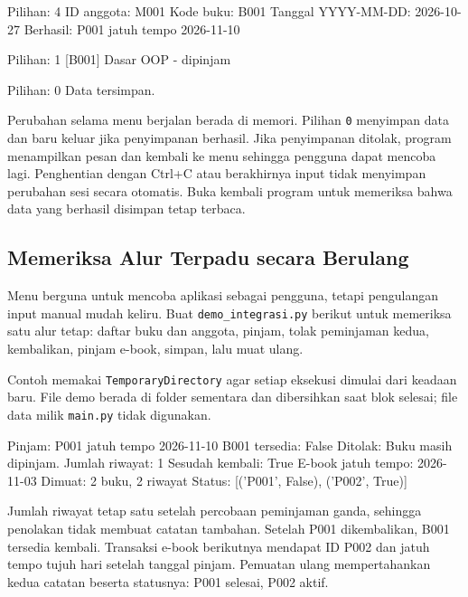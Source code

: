 \begin{keluaran}
Pilihan: 4
ID anggota: M001
Kode buku: B001
Tanggal YYYY-MM-DD: 2026-10-27
Berhasil: P001 jatuh tempo 2026-11-10

Pilihan: 1
[B001] Dasar OOP - dipinjam

Pilihan: 0
Data tersimpan.
\end{keluaran}

Perubahan selama menu berjalan berada di memori. Pilihan \texttt{0} menyimpan data dan baru keluar jika penyimpanan berhasil. Jika penyimpanan ditolak, program menampilkan pesan dan kembali ke menu sehingga pengguna dapat mencoba lagi. Penghentian dengan Ctrl+C atau berakhirnya input tidak menyimpan perubahan sesi secara otomatis. Buka kembali program untuk memeriksa bahwa data yang berhasil disimpan tetap terbaca.

\subsection{Memeriksa Alur Terpadu secara Berulang}

Menu berguna untuk mencoba aplikasi sebagai pengguna, tetapi pengulangan input manual mudah keliru. Buat \texttt{demo\_integrasi.py} berikut untuk memeriksa satu alur tetap: daftar buku dan anggota, pinjam, tolak peminjaman kedua, kembalikan, pinjam e-book, simpan, lalu muat ulang.

Contoh memakai \texttt{TemporaryDirectory} agar setiap eksekusi dimulai dari keadaan baru. File demo berada di folder sementara dan dibersihkan saat blok selesai; file data milik \texttt{main.py} tidak digunakan.

\begin{kode}
\end{kode}

\begin{keluaran}
Pinjam: P001 jatuh tempo 2026-11-10
B001 tersedia: False
Ditolak: Buku masih dipinjam.
Jumlah riwayat: 1
Sesudah kembali: True
E-book jatuh tempo: 2026-11-03
Dimuat: 2 buku, 2 riwayat
Status: [('P001', False), ('P002', True)]
\end{keluaran}

Jumlah riwayat tetap satu setelah percobaan peminjaman ganda, sehingga penolakan tidak membuat catatan tambahan. Setelah P001 dikembalikan, B001 tersedia kembali. Transaksi e-book berikutnya mendapat ID P002 dan jatuh tempo tujuh hari setelah tanggal pinjam. Pemuatan ulang mempertahankan kedua catatan beserta statusnya: P001 selesai, P002 aktif.

